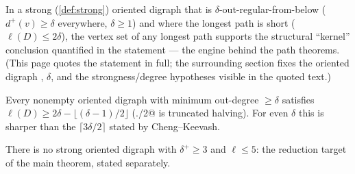 

\begin{decoded}
In a strong (\cref{def:strong}) oriented digraph that is
$\delta$-out-regular-from-below ($d^+(v) \ge \delta$ everywhere,
$\delta \ge 1$) and where the longest path is short
($\ell(D) \le 2\delta$), the vertex set of any longest path supports
the structural ``kernel'' conclusion quantified in the statement ---
the engine behind the path theorems. (This page quotes the statement
in full; the surrounding section fixes the oriented digraph
\rocqinline@D@, $\delta$, and the strongness/degree hypotheses
visible in the quoted text.)
\end{decoded}






\begin{decoded}
Every nonempty oriented digraph with minimum out-degree $\ge \delta$
satisfies $\ell(D) \ge 2\delta - \lfloor(\delta-1)/2\rfloor$
(\rocqinline@./2@ is truncated halving). For even $\delta$ this is
sharper than the $\lceil 3\delta/2 \rceil$ stated by Cheng--Keevash.
\end{decoded}






\begin{decoded}
There is no strong oriented digraph with $\delta^+ \ge 3$ and
$\ell \le 5$: the reduction target of the main theorem, stated
separately.
\end{decoded}


